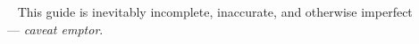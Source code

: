 

\clearpage
\renewcommand\indexname{Subject Index}
\thispagestyle{chapter}
\small
\begin{flushleft}
\printindex
\end{flushleft}
\normalsize

\addtocounter{page}{-1}
\addtocounter{page}{+1}

~
\vfill
\thispagestyle{empty}
This guide is inevitably incomplete, inaccurate, and otherwise imperfect \\ {} \hfill   --- \emph{caveat emptor}.


